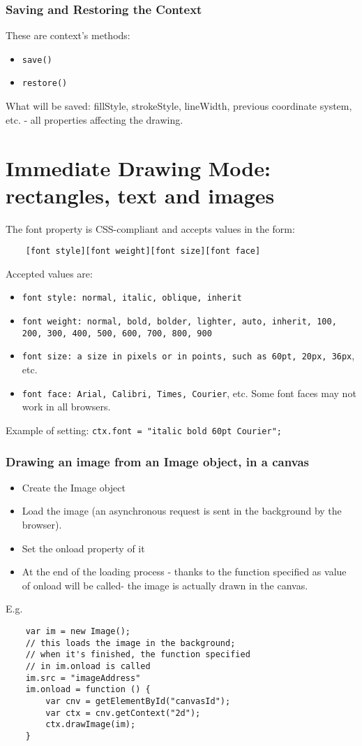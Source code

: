 \documentclass[a4paper,11pt]{book}
\begin{document}
	\subsubsection{Saving and Restoring the Context}
	These are context's methods:
	\begin{itemize}
	\item \texttt{save()}
	\item \texttt{restore()}
	\end{itemize}
	What will be saved: fillStyle, strokeStyle, lineWidth, previous
	coordinate system, etc. - all properties affecting the drawing.
	
	
\section{Immediate Drawing Mode: rectangles, text and images}
	The font property is CSS-compliant and accepts values in the form:
	\begin{verbatim}
	[font style][font weight][font size][font face]
	\end{verbatim}
	Accepted values are:
	\begin{itemize}
	\item \texttt{font style: normal, italic, oblique, inherit}
	\item \texttt{font weight: normal, bold, bolder, lighter, auto, inherit, 100, 200, 300, 400, 500, 600, 700, 800, 900}
	\item \texttt{font size: a size in pixels or in points, such as 60pt, 20px, 36px}, etc.
	\item \texttt{font face: Arial, Calibri, Times, Courier}, etc. Some font faces may not work in all browsers.
	\end{itemize}
	Example of setting:
	\texttt{ctx.font = "italic bold 60pt Courier";}
	\subsubsection{Drawing an image from an Image object, in a canvas}
	\begin{itemize}
	\item Create the Image object
	\item Load the image (an asynchronous request is sent in the background by the browser).
	\item Set the onload property of it
	\item At the end of the loading process - thanks to the function specified as value of onload will be called-
		the image is actually drawn in the canvas.
	\end{itemize}
	E.g.
	\begin{verbatim}
	var im = new Image();
	// this loads the image in the background;
	// when it's finished, the function specified
	// in im.onload is called
	im.src = "imageAddress"
	im.onload = function () {
		var cnv = getElementById("canvasId");
		var ctx = cnv.getContext("2d");
		ctx.drawImage(im);
	}
	\end{verbatim}
	
\end{document}
